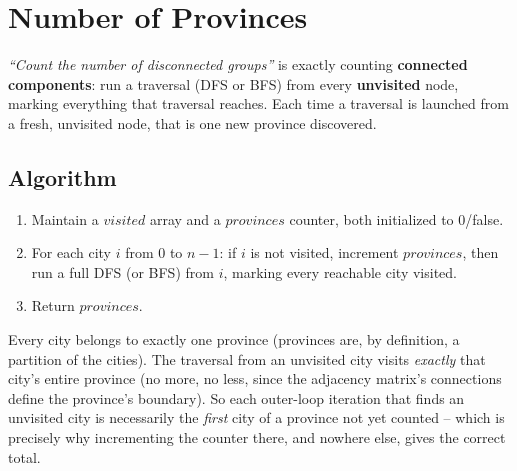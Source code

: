 \section{Number of Provinces}
\label{sec:graph-number-of-provinces}


\begin{patternbox}
\emph{``Count the number of disconnected groups''} is exactly counting
\textbf{connected components}: run a traversal (DFS or BFS) from every
\textbf{unvisited} node, marking everything that traversal reaches.
Each time a traversal is launched from a fresh, unvisited node, that is
one new province discovered.
\end{patternbox}

\subsection*{Algorithm}

\begin{enumerate}
  \item Maintain a $\textit{visited}$ array and a $\textit{provinces}$
        counter, both initialized to $0$/false.
  \item For each city $i$ from $0$ to $n-1$: if $i$ is not visited,
        increment $\textit{provinces}$, then run a full DFS (or BFS)
        from $i$, marking every reachable city visited.
  \item Return $\textit{provinces}$.
\end{enumerate}

\begin{ideabox}
Every city belongs to exactly one province (provinces are, by
definition, a partition of the cities). The traversal from an
unvisited city visits \emph{exactly} that city's entire province (no
more, no less, since the adjacency matrix's connections define the
province's boundary). So each outer-loop iteration that finds an
unvisited city is necessarily the \emph{first} city of a province not
yet counted -- which is precisely why incrementing the counter there,
and nowhere else, gives the correct total.
\end{ideabox}

